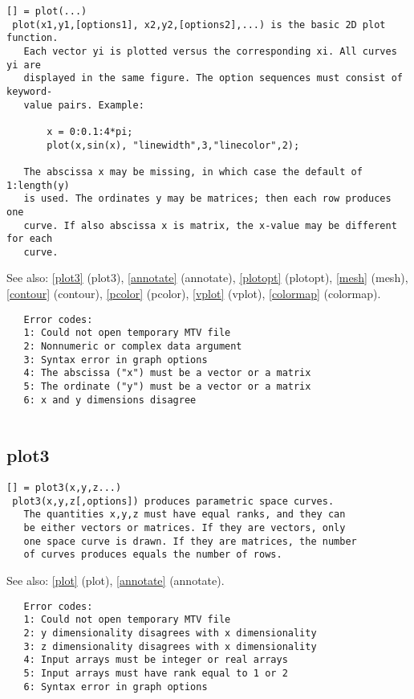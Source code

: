 \documentclass[a4paper]{article}
\begin{document}
\begin{tscreen}
\begin{verbatim}
[] = plot(...)
 plot(x1,y1,[options1], x2,y2,[options2],...) is the basic 2D plot function.
   Each vector yi is plotted versus the corresponding xi. All curves yi are
   displayed in the same figure. The option sequences must consist of keyword-
   value pairs. Example:

       x = 0:0.1:4*pi;
       plot(x,sin(x), "linewidth",3,"linecolor",2);

   The abscissa x may be missing, in which case the default of 1:length(y)
   is used. The ordinates y may be matrices; then each row produces one
   curve. If also abscissa x is matrix, the x-value may be different for each
   curve.
\end{verbatim}

See also: \ref{plot3} {(plot3)}, \ref{annotate} {(annotate)}, \ref{plotopt} {(plotopt)}, \ref{mesh} {(mesh)}, \ref{contour} {(contour)}, \ref{pcolor} {(pcolor)}, \ref{vplot} {(vplot)}, \ref{colormap} {(colormap)}.
\begin{verbatim}
   Error codes:
   1: Could not open temporary MTV file
   2: Nonnumeric or complex data argument
   3: Syntax error in graph options
   4: The abscissa ("x") must be a vector or a matrix
   5: The ordinate ("y") must be a vector or a matrix
   6: x and y dimensions disagree
   
\end{verbatim}
\end{tscreen}



\subsection{plot3\label{plot3}}

\begin{tscreen}
\begin{verbatim}
[] = plot3(x,y,z...)
 plot3(x,y,z[,options]) produces parametric space curves.
   The quantities x,y,z must have equal ranks, and they can
   be either vectors or matrices. If they are vectors, only
   one space curve is drawn. If they are matrices, the number
   of curves produces equals the number of rows.
\end{verbatim}

See also: \ref{plot} {(plot)}, \ref{annotate} {(annotate)}.
\begin{verbatim}
   Error codes:
   1: Could not open temporary MTV file
   2: y dimensionality disagrees with x dimensionality
   3: z dimensionality disagrees with x dimensionality
   4: Input arrays must be integer or real arrays
   5: Input arrays must have rank equal to 1 or 2
   6: Syntax error in graph options
   
\end{verbatim}
\end{tscreen}
\end{document}
